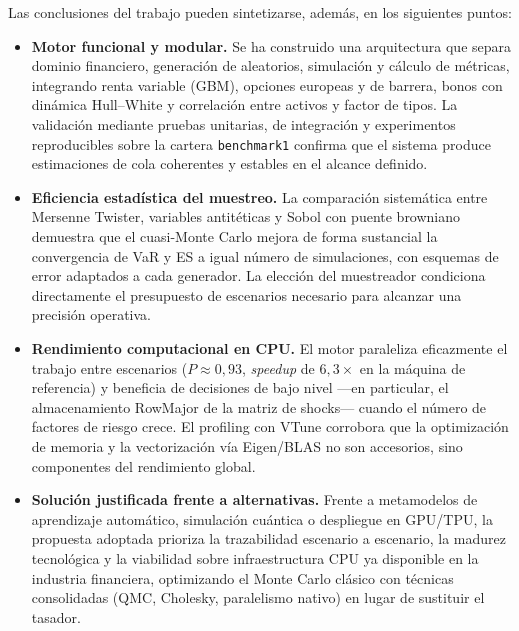 \documentclass[11pt]{article}
\begin{document}
Las conclusiones del trabajo pueden sintetizarse, además, en los siguientes puntos:

\begin{itemize}
    \item \textbf{Motor funcional y modular.}
    Se ha construido una arquitectura que separa dominio financiero, generación de aleatorios, simulación y cálculo de métricas, integrando renta variable (GBM), opciones europeas y de barrera, bonos con dinámica Hull--White y correlación entre activos y factor de tipos.
    La validación mediante pruebas unitarias, de integración y experimentos reproducibles sobre la cartera \texttt{benchmark1} confirma que el sistema produce estimaciones de cola coherentes y estables en el alcance definido.

    \item \textbf{Eficiencia estadística del muestreo.}
    La comparación sistemática entre Mersenne Twister, variables antitéticas y Sobol con puente browniano demuestra que el cuasi-Monte Carlo mejora de forma sustancial la convergencia de VaR y ES a igual número de simulaciones, con esquemas de error adaptados a cada generador.
    La elección del muestreador condiciona directamente el presupuesto de escenarios necesario para alcanzar una precisión operativa.

    \item \textbf{Rendimiento computacional en CPU.}
    El motor paraleliza eficazmente el trabajo entre escenarios ($P \approx 0{,}93$, \emph{speedup} de $6{,}3\times$ en la máquina de referencia) y beneficia de decisiones de bajo nivel ---en particular, el almacenamiento RowMajor de la matriz de shocks--- cuando el número de factores de riesgo crece.
    El profiling con VTune corrobora que la optimización de memoria y la vectorización vía Eigen/BLAS no son accesorios, sino componentes del rendimiento global.

    \item \textbf{Solución justificada frente a alternativas.}
    Frente a metamodelos de aprendizaje automático, simulación cuántica o despliegue en GPU/TPU, la propuesta adoptada prioriza la trazabilidad escenario a escenario, la madurez tecnológica y la viabilidad sobre infraestructura CPU ya disponible en la industria financiera, optimizando el Monte Carlo clásico con técnicas consolidadas (QMC, Cholesky, paralelismo nativo) en lugar de sustituir el tasador.


\end{itemize}
\end{document}
